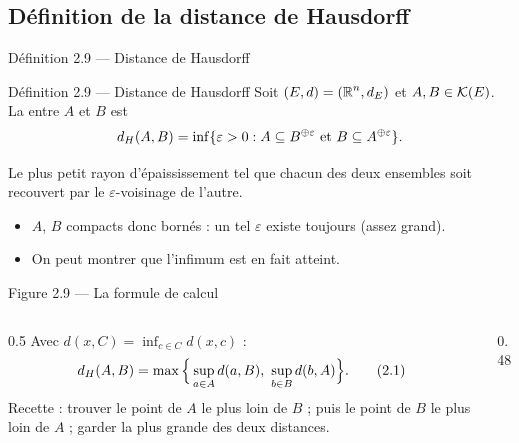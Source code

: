 \subsection{Définition de la distance de Hausdorff}

\begin{frame}{Définition 2.9 --- Distance de Hausdorff}
  \begin{Enonce}{Définition 2.9 --- Distance de Hausdorff}
    Soit $(E,d)=(\operatorname{\mathbb{R}}^n,d_E)$ et $A,B\in\mathcal{K}(E)$. La  entre $A$ et $B$ est
    \[
      d_H(A,B) = \inf\{\varepsilon>0 : A\subseteq B^{\oplus \varepsilon}
      \text{ et } B\subseteq A^{\oplus \varepsilon}\}.
    \]
  \end{Enonce}
  \small Le plus petit rayon d'épaississement tel que chacun des
  deux ensembles soit recouvert par le $\varepsilon$-voisinage de
  l'autre.
  \begin{itemize}
    \item $A$, $B$ compacts donc bornés : un tel $\varepsilon$ existe
      toujours (assez grand).
    \item On peut montrer que l'infimum est en fait atteint.
  \end{itemize}
\end{frame}

\begin{frame}{Figure 2.9 --- La formule de calcul}
  \begin{columns}[c]
    \begin{column}{0.5\textwidth}
      \small Avec $d(x,C) = \inf_{c\in C} d(x,c)$ :
      \[
        d_H(A,B) = \max\Big\{\sup_{a\in A} d(a,B),\ \sup_{b\in B} d(b,A)\Big\}.
        \tag{2.1}
      \]
      Recette : trouver le point de $A$ le plus loin de $B$ ;
      puis le point de $B$ le plus loin de $A$ ; garder la plus grande
      des deux distances.
    \end{column}
    \begin{column}{0.48\textwidth}
    \end{column}
  \end{columns}
\end{frame}

